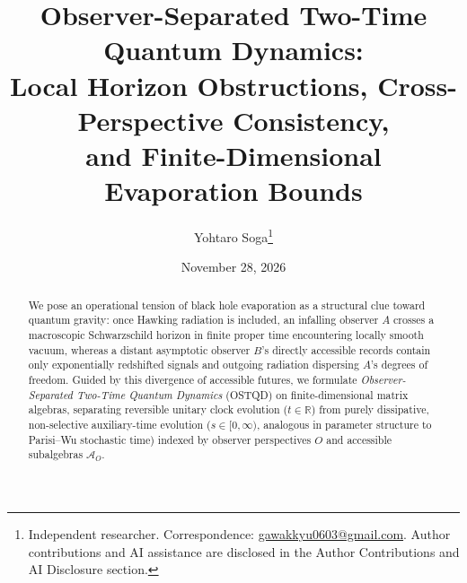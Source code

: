 \documentclass[11pt,a4paper]{article}
\title{\textbf{Observer-Separated Two-Time Quantum Dynamics:\\
Local Horizon Obstructions, Cross-Perspective Consistency,\\
and Finite-Dimensional Evaporation Bounds}}
\author{Yohtaro Soga\thanks{Independent researcher. Correspondence: \href{mailto:gawakkyu0603@gmail.com}{gawakkyu0603@gmail.com}. Author contributions and AI assistance are disclosed in the Author Contributions and AI Disclosure section.}}
\date{November 28, 2026}
\theoremstyle{definition}
\theoremstyle{remark}
\newcommand{\cA}{\mathcal{A}}
\newcommand{\bbR}{\mathbb{R}}
\newcommand{\1}{\mathbf{1}}
\begin{document}
\maketitle
\vspace{-1.2em}
\begin{abstract}\footnotesize
We pose an operational tension of black hole evaporation as a structural clue toward quantum gravity: once Hawking radiation is included, an infalling observer $A$ crosses a macroscopic Schwarzschild horizon in finite proper time encountering locally smooth vacuum, whereas a distant asymptotic observer $B$'s directly accessible records contain only exponentially redshifted signals and outgoing radiation dispersing $A$'s degrees of freedom. Guided by this divergence of accessible futures, we formulate \emph{Observer-Separated Two-Time Quantum Dynamics} (OSTQD) on finite-dimensional matrix algebras, separating reversible unitary clock evolution ($t \in \bbR$) from purely dissipative, non-selective auxiliary-time evolution ($s \in [0,\infty)$, analogous in parameter structure to Parisi--Wu stochastic time) indexed by observer perspectives $O$ and accessible subalgebras $\cA_O$.


\end{abstract}
\end{document}
